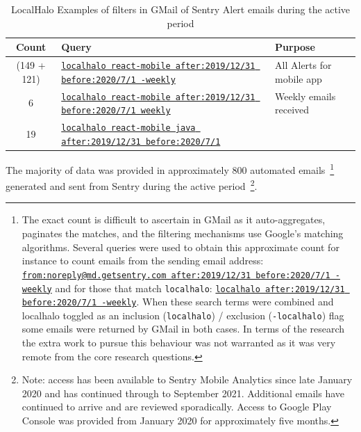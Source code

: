\begin{table}
    \centering
    \captionsetup{font=scriptsize}
    \tiny
    \begin{tabular}{cll}
        Count & Query & Purpose \\
        \toprule
       (149 + 121) & \href{https://mail.google.com/mail/u/0/#search/localhalo+react-mobile++after\%3A2019\%2F12\%2F31+before\%3A2020\%2F7\%2F1+-weekly/p3}{\texttt{localhalo react-mobile  after:2019/12/31 before:2020/7/1 -weekly}} &All Alerts for mobile app \\
       6 & \href{https://mail.google.com/mail/u/0/#search/localhalo+react-mobile++after\%3A2019\%2F12\%2F31+before\%3A2020\%2F7\%2F1+weekly}{\texttt{localhalo react-mobile  after:2019/12/31 before:2020/7/1 weekly}} & Weekly emails received \\
        19 & \href{https://mail.google.com/mail/u/0/#search/localhalo+react-mobile+java+after\%3A2019\%2F12\%2F31+before\%3A2020\%2F7\%2F1}{\texttt{localhalo react-mobile java after:2019/12/31 before:2020/7/1}} \\
       \bottomrule
    \end{tabular}
    \caption{LocalHalo Examples of filters in GMail of Sentry Alert emails during the active period}
    \label{tab:localhalo-gmail-filters-sentry-alert-emails}
\end{table}


The majority of data was provided in approximately 800 automated emails~\footnote{The exact count is difficult to ascertain in GMail as it auto-aggregates, paginates the matches, and the filtering mechanisms use Google's matching algorithms. Several queries were used to obtain this approximate count for instance to count emails from the sending email address: \href{https://mail.google.com/mail/u/0/\#search/from\%3Anoreply\%40md.getsentry.com++after\%3A2019\%2F12\%2F31+before\%3A2020\%2F7\%2F1+-weekly}{\texttt{from:noreply@md.getsentry.com  after:2019/12/31 before:2020/7/1 -weekly}} and for those that match \texttt{localhalo}: \href{https://mail.google.com/mail/u/0/\#search/localhalo++after\%3A2019\%2F12\%2F31+before\%3A2020\%2F7\%2F1+-weekly}{\texttt{localhalo  after:2019/12/31 before:2020/7/1 -weekly}}. When these search terms were combined and localhalo toggled as an inclusion (\texttt{localhalo}) / exclusion (\texttt{-localhalo}) flag some emails were returned by GMail in both cases. In terms of the research the extra work to pursue this behaviour was not warranted as it was very remote from the core research questions.} generated and sent from Sentry during the active period~\footnote{Note: access has been available to Sentry Mobile Analytics since late January 2020 and has continued through to September 2021. Additional emails have continued to arrive and are reviewed sporadically.  Access to Google Play Console was provided from  January 2020 for approximately five months.}. 

